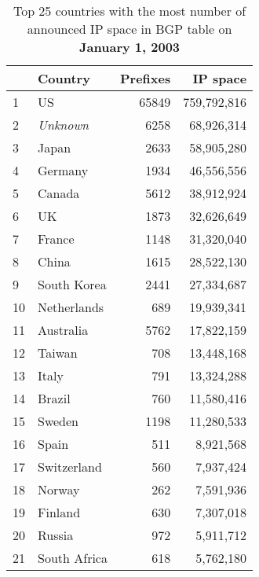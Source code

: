 \begin{table*}[p]
\begin{minipage}[t]{0.48\textwidth}
	\begin{center}
	\caption{Top 25 countries with the most number of announced IP space in BGP table on \textbf{January 1, 2003}}
	\label{tab:top25 bgp ip space 2003}
	\begin{tabular}{|l||l|r|r|}
		\hline
		&      \bf Country		&    Prefixes   &       IP space 		\tabularnewline \hline 
1       &       US      		&       65849   &       759,792,816     \tabularnewline %
2       &       \emph{Unknown} 	&       6258    &       68,926,314      \tabularnewline %
3       &       Japan   		&       2633    &       58,905,280      \tabularnewline %
4       &       Germany 		&       1934    &       46,556,556      \tabularnewline %
5       &       Canada  		&       5612    &       38,912,924      \tabularnewline %
6       &       UK      		&       1873    &       32,626,649      \tabularnewline %
7       &       France  		&       1148    &       31,320,040      \tabularnewline %
8       &       China   		&       1615    &       28,522,130      \tabularnewline %
9       &       South Korea     &       2441    &       27,334,687      \tabularnewline %
10      &       Netherlands     &       689     &       19,939,341      \tabularnewline %
11      &       Australia       &       5762    &       17,822,159      \tabularnewline %
12      &       Taiwan  		&       708     &       13,448,168      \tabularnewline %
13      &       Italy   		&       791     &       13,324,288      \tabularnewline %
14      &       Brazil  		&       760     &       11,580,416      \tabularnewline %
15      &       Sweden  		&       1198    &       11,280,533      \tabularnewline %
16      &       Spain   		&       511     &       8,921,568       \tabularnewline %
17      &       Switzerland     &       560     &       7,937,424       \tabularnewline %
18      &       Norway  		&       262     &       7,591,936       \tabularnewline %
19      &       Finland 		&       630     &       7,307,018       \tabularnewline %
20      &       Russia  		&       972     &       5,911,712       \tabularnewline %
21      &       South Africa    &       618     &       5,762,180       \tabularnewline %

\end{tabular}
\end{center}
\end{minipage}
\end{table*}
